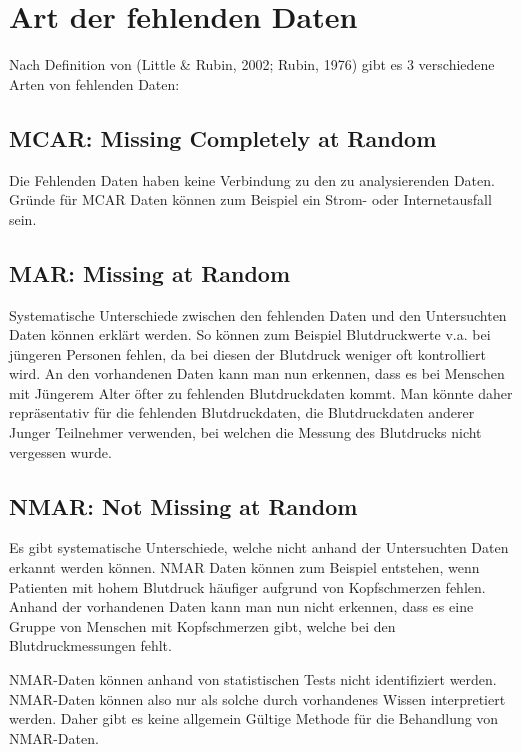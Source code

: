 \section{Art der fehlenden Daten}
\label{section:descriptor_of_missingness}

Nach Definition von (Little \& Rubin, 2002; Rubin, 1976) gibt es 3 verschiedene Arten von fehlenden Daten:

\subsection{MCAR: Missing Completely at Random}

Die Fehlenden Daten haben keine Verbindung zu den zu analysierenden Daten. Gründe für MCAR Daten 
können zum Beispiel ein Strom- oder Internetausfall sein. \autocite[8]{Enders2017}

\subsection{MAR: Missing at Random}

Systematische Unterschiede zwischen den fehlenden Daten und den Untersuchten Daten können erklärt 
werden. So können zum Beispiel Blutdruckwerte v.a. bei jüngeren Personen fehlen, da bei diesen 
der Blutdruck weniger oft kontrolliert wird. \autocite[157]{Sterne2009} An den vorhandenen Daten 
kann man nun erkennen, dass es bei Menschen mit Jüngerem Alter öfter zu fehlenden Blutdruckdaten 
kommt. Man könnte daher repräsentativ für die fehlenden Blutdruckdaten, die Blutdruckdaten anderer 
Junger Teilnehmer verwenden, bei welchen die Messung des Blutdrucks nicht vergessen wurde. 

\subsection{NMAR: Not Missing at Random}

Es gibt systematische Unterschiede, welche nicht anhand der Untersuchten Daten erkannt werden 
können. NMAR Daten können zum Beispiel entstehen, wenn Patienten mit hohem Blutdruck häufiger 
aufgrund von Kopfschmerzen fehlen. \autocite[157]{Sterne2009} Anhand der vorhandenen Daten kann
 man nun nicht erkennen, dass es eine Gruppe von Menschen mit Kopfschmerzen gibt, welche bei den 
 Blutdruckmessungen fehlt. 

NMAR-Daten können anhand von statistischen Tests nicht identifiziert werden. NMAR-Daten können 
also nur als solche durch vorhandenes Wissen interpretiert werden. Daher gibt es keine allgemein 
Gültige Methode für die Behandlung von NMAR-Daten. \autocite[1088]{Donders2006}


